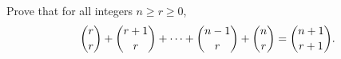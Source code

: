 Prove that for all integers $n\ge r\ge0$,
\[\dbinom rr+\dbinom{r+1}{r}+\cdots+\dbinom{n-1}{r}+\dbinom nr=\dbinom{n+1}{r+1}.\]
